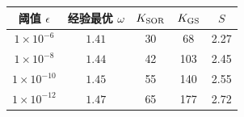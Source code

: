 \begin{tabular}{ccccc}
\toprule
阈值 $\epsilon$ & 经验最优 $\omega$ & $K_{\rm SOR}$ & $K_{\rm GS}$ & $S$ \\
\midrule
$1\times10^{-6}$ & $1.41$ & 30 & 68 & 2.27 \\
$1\times10^{-8}$ & $1.44$ & 42 & 103 & 2.45 \\
$1\times10^{-10}$ & $1.45$ & 55 & 140 & 2.55 \\
$1\times10^{-12}$ & $1.47$ & 65 & 177 & 2.72 \\
\bottomrule
\end{tabular}
